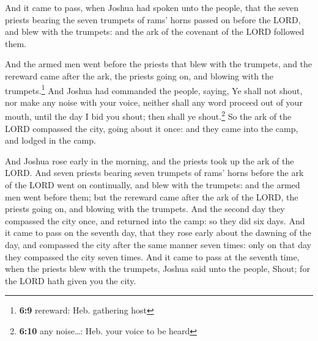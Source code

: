  And it came to pass, when Joshua had spoken unto the
people, that the seven priests bearing the seven trumpets of rams' horns
passed on before the LORD, and blew with the trumpets: and the ark of
the covenant of the LORD followed them.

 And the armed men went before the priests that blew with
the trumpets, and the rereward came after the ark, the priests going on,
and blowing with the trumpets.\footnote{\textbf{6:9} rereward: Heb.
  gathering host}  And Joshua had commanded the people,
saying, Ye shall not shout, nor make any noise with your voice, neither
shall any word proceed out of your mouth, until the day I bid you shout;
then shall ye shout.\footnote{\textbf{6:10} any noise\ldots: Heb. your
  voice to be heard}  So the ark of the LORD compassed
the city, going about it once: and they came into the camp, and lodged
in the camp.

 And Joshua rose early in the morning, and the priests
took up the ark of the LORD.  And seven priests bearing
seven trumpets of rams' horns before the ark of the LORD went on
continually, and blew with the trumpets: and the armed men went before
them; but the rereward came after the ark of the LORD, the priests going
on, and blowing with the trumpets.  And the second day
they compassed the city once, and returned into the camp: so they did
six days.  And it came to pass on the seventh day, that
they rose early about the dawning of the day, and compassed the city
after the same manner seven times: only on that day they compassed the
city seven times.  And it came to pass at the seventh
time, when the priests blew with the trumpets, Joshua said unto the
people, Shout; for the LORD hath given you the city.

